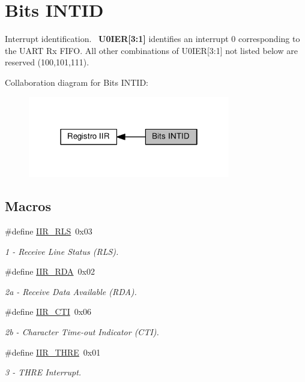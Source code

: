 \hypertarget{group___i_n_t_i_d}{}\section{Bits I\+N\+T\+ID}
\label{group___i_n_t_i_d}


Interrupt identification.~\newline
 {\bfseries  U0\+I\+ER\mbox{[}3\+:1\mbox{]} } identifies an interrupt 0 corresponding to the U\+A\+RT Rx F\+I\+FO. All other combinations of U0\+I\+ER\mbox{[}3\+:1\mbox{]} not listed below are reserved (100,101,111).  


Collaboration diagram for Bits I\+N\+T\+ID\+:\nopagebreak
\begin{figure}[H]
\begin{center}
\leavevmode
\includegraphics[width=250pt]{group___i_n_t_i_d}
\end{center}
\end{figure}
\subsection*{Macros}
\begin{DoxyCompactItemize}
\item 
\#define \hyperlink{group___i_n_t_i_d_ga03db7def835d2e60f1cc7470bdf35b08}{I\+I\+R\+\_\+\+R\+LS}~0x03
\begin{DoxyCompactList}\small\item\em 1 -\/ Receive Line Status (R\+LS). \end{DoxyCompactList}\item 
\#define \hyperlink{group___i_n_t_i_d_ga80925dd3aa4708e148a9d63088b4758d}{I\+I\+R\+\_\+\+R\+DA}~0x02
\begin{DoxyCompactList}\small\item\em 2a -\/ Receive Data Available (R\+DA). \end{DoxyCompactList}\item 
\#define \hyperlink{group___i_n_t_i_d_ga4842d23857b5599cf59365f23a46722f}{I\+I\+R\+\_\+\+C\+TI}~0x06
\begin{DoxyCompactList}\small\item\em 2b -\/ Character Time-\/out Indicator (C\+TI). \end{DoxyCompactList}\item 
\#define \hyperlink{group___i_n_t_i_d_gafbff8bd626a8fce1f6082d355000c2b2}{I\+I\+R\+\_\+\+T\+H\+RE}~0x01
\begin{DoxyCompactList}\small\item\em 3 -\/ T\+H\+RE Interrupt. \end{DoxyCompactList}\end{DoxyCompactItemize}



